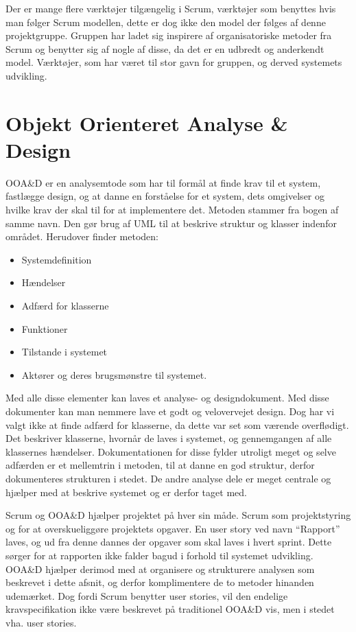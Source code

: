 Der er mange flere værktøjer tilgængelig i Scrum, værktøjer som benyttes hvis man følger Scrum modellen, dette er dog ikke den model der følges af denne projektgruppe.
Gruppen har ladet sig inspirere af organisatoriske metoder fra Scrum og benytter sig af nogle af disse, da det er en udbredt og anderkendt model.
Værktøjer, som har været til stor gavn for gruppen, og derved systemets udvikling.

\section{Objekt Orienteret Analyse \& Design}

OOA\&D er en analysemtode som har til formål at finde krav til et system, fastlægge design, og at danne en forståelse for et system, dets omgivelser og hvilke krav der skal til for at implementere det.
Metoden stammer fra bogen af samme navn.\citep{OOA&D2001}
Den gør brug af UML til at beskrive struktur og klasser indenfor området.
Herudover finder metoden:

\begin{itemize}
\item Systemdefinition
\item Hændelser
\item Adfærd for klasserne
\item Funktioner
\item Tilstande i systemet
\item Aktører og deres brugsmønstre til systemet.
\end{itemize}

Med alle disse elementer kan laves et analyse- og designdokument.
Med disse dokumenter kan man nemmere lave et godt og velovervejet design.
Dog har vi valgt ikke at finde adfærd for klasserne, da dette var set som værende overflødigt.
Det beskriver klasserne, hvornår de laves i systemet, og gennemgangen af alle klassernes hændelser. 
Dokumentationen for disse fylder utroligt meget og selve adfærden er et mellemtrin i metoden, til at danne en god struktur, derfor dokumenteres strukturen i stedet.
De andre analyse dele er meget centrale og hjælper med at beskrive systemet og er derfor taget med. 

Scrum og OOA\&D hjælper projektet på hver sin måde.
Scrum som projektstyring og for at overskueliggøre projektets opgaver. 
En user story ved navn ``Rapport'' laves, og ud fra denne dannes der opgaver som skal laves i hvert sprint. 
Dette sørger for at rapporten ikke falder bagud i forhold til systemet udvikling.
OOA\&D hjælper derimod med at organisere og strukturere analysen som beskrevet i dette afsnit, og derfor komplimentere de to metoder hinanden udemærket.
Dog fordi Scrum benytter user stories, vil den endelige kravspecifikation ikke være beskrevet på traditionel OOA\&D vis, men i stedet vha. user stories.









